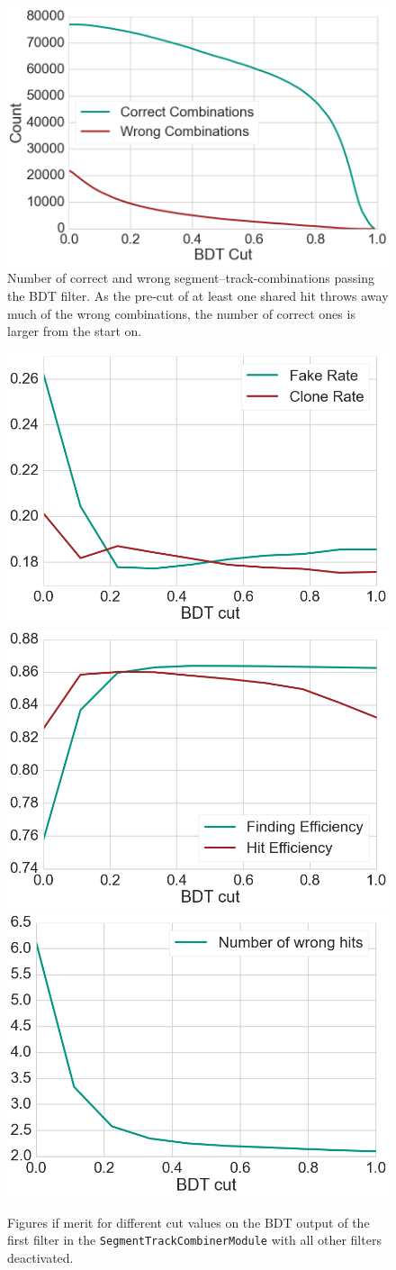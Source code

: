 \begin{figure}
  \centering
  \includegraphics[width=0.7\linewidth]{figures/workflow/first_filter_count.png}
  \caption{Number of correct and wrong segment--track-combinations passing the BDT filter. As the pre-cut of at least one shared hit throws away much of the wrong combinations, the number of correct ones is larger from the start on.}
  \label{fig-first-filter-count}
\end{figure}

\begin{figure}
  \centering
  \includegraphics[width=0.48\linewidth]{figures/workflow/first_filter_rate.png}
  \includegraphics[width=0.48\linewidth]{figures/workflow/first_filter_efficiency.png}
  \includegraphics[width=0.48\linewidth]{figures/workflow/first_filter_wrong_hits.png}
  \caption{Figures if merit for different cut values on the BDT output of the first filter in the \texttt{SegmentTrackCombinerModule} with all other filters deactivated.}
  \label{fig-first-filter-fom}
\end{figure}


